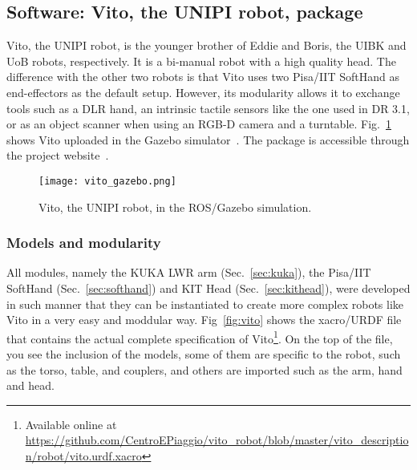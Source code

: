 \subsection{Software: Vito, the UNIPI robot, package}
\label{sec:vito}

Vito, the UNIPI robot, is the younger brother of Eddie and Boris, the UIBK and UoB robots, respectively. It is a bi-manual robot with a high quality head. The difference with the other two robots is that Vito uses two Pisa/IIT SoftHand as end-effectors as the default setup. However, its modularity allows it to exchange tools such as a DLR hand, an intrinsic tactile sensors like the one used in DR 3.1, or as an object scanner when using an RGB-D camera and a turntable. Fig.~\ref{fig:vito_gazebo} shows Vito uploaded in the Gazebo simulator~\cite{webgazebo}. The package is accessible through the project website~\cite{PACMAN_software}.

\begin{figure}[h]
\centering
\texttt{[image: vito\_gazebo.png]}
\caption{Vito, the UNIPI robot, in the ROS/Gazebo simulation.}
\label{fig:vito_gazebo}
\end{figure}

\subsubsection{Models and modularity}

All modules, namely the KUKA LWR arm (Sec.~\ref{sec:kuka}), the Pisa/IIT SoftHand (Sec.~\ref{sec:softhand}) and KIT Head (Sec.~\ref{sec:kithead}), were developed in such manner that they can be instantiated to create more complex robots like Vito in a very easy and moddular way. Fig~\ref{fig:vito} shows the xacro/URDF file that contains the actual complete specification of Vito\footnote[1]{Available online at \url{https://github.com/CentroEPiaggio/vito_robot/blob/master/vito_description/robot/vito.urdf.xacro}}. On the top of the file, you see the inclusion of the models, some of them are specific to the robot, such as the torso, table, and couplers, and others are imported such as the arm, hand and head.

